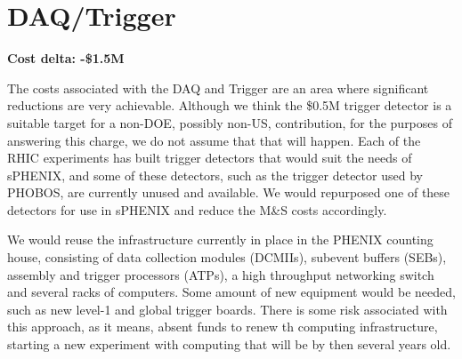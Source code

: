 \section*{DAQ/Trigger}
\label{daq}

\textbf{Cost delta: -\$1.5M}

The costs associated with the DAQ and Trigger are an area where
significant reductions are very achievable.  Although we think the
\$0.5M trigger detector is a suitable target for a non-DOE, possibly
non-US, contribution, for the purposes of answering this charge, we do
not assume that that will happen.  Each of the RHIC experiments has
built trigger detectors that would suit the needs of sPHENIX, and some
of these detectors, such as the trigger detector used by PHOBOS, are
currently unused and available.  We would repurposed one of these
detectors for use in sPHENIX and reduce the M\&S costs accordingly.

We would reuse the infrastructure currently in place in the PHENIX
counting house, consisting of data collection modules (DCMIIs),
subevent buffers (SEBs), assembly and trigger processors (ATPs), a
high throughput networking switch and several racks of computers.
Some amount of new equipment would be needed, such as new level-1 and
global trigger boards.  There is some risk associated with this
approach, as it means, absent funds to renew th computing
infrastructure, starting a new experiment with computing that will be
by then several years old.



